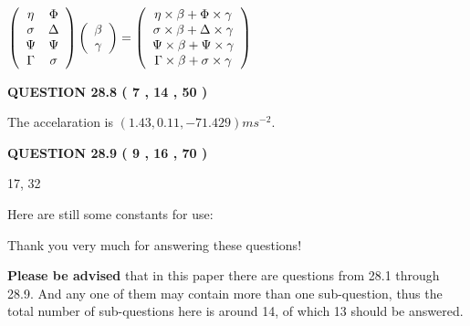 \documentclass[12pt]{article}
\begin{document}
$  %
 \left( \begin{array}
 {
 c
 c
 }
 \eta & 
 \Phi \\ 
 \sigma & 
 \Delta \\ 
 \Psi & 
 \Psi \\ 
 \Gamma & 
 \sigma
 \end{array} \right)
 \left( \begin{array}
 {
 c
 }
 \beta \\ 
 \gamma
 \end{array} \right)
=
 \left( \begin{array}
 {
 c
 }
  \eta \times  \beta +  \Phi \times  \gamma \\ 
  \sigma \times  \beta +  \Delta \times  \gamma \\ 
  \Psi \times  \beta +  \Psi \times  \gamma \\ 
  \Gamma \times  \beta +  \sigma \times  \gamma
 \end{array} \right)
$
 
 
 
  
\vspace{0.2in}
  
{\textbf{\Large{QUESTION
28.8 
 (           7 ,          14 ,          50 )
}}}
  
  
 
 
\noindent{}
 
 
  The accelaration is $  %
(
1.43,
0.11,
-71.429)
ms^{-2} $.
 
 
 
 
  
\vspace{0.2in}
  
{\textbf{\Large{QUESTION
28.9 
 (           9 ,          16 ,          70 )
}}}
  
  


 
 
\noindent{}

17,  %
32
 
 
 
   
   
 \vspace{0.2in}
Here are still some constants for use:
 
 
 
 
Thank you very much for answering these questions!
 
{\textbf{\large{Please be advised}}} that in this paper there are questions from
28.1 through
28.9.
And any one of them may contain more than one sub-question, thus the total number
of sub-questions here is around 14, of which
13 should be answered.
 
\end{document}
